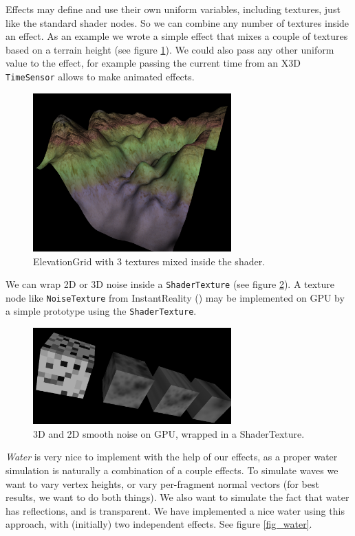\documentclass{egpubl}
\begin{document}
Effects may define and use their own uniform variables, including textures,
just like the standard shader nodes. So we can combine any number of textures
inside an effect. As an example we wrote a simple effect that mixes a couple of
textures based on a terrain height (see figure \ref{fig_terrain}).
We could also pass any other uniform value to the effect, for example
passing the current time from an X3D \texttt{TimeSensor} allows to make
animated effects.

\begin{figure}[H]
  \centering
  \includegraphics[width=3in]{terrain}
  \caption{ElevationGrid with 3 textures mixed inside the shader.}
  \label{fig_terrain}
\end{figure}

We can wrap 2D or 3D noise inside a \texttt{ShaderTexture}
(see figure \ref{fig_noise}).
A texture node like \texttt{NoiseTexture} from InstantReality
(\cite{instant:noisetex})
may be implemented on GPU by a simple prototype using the \texttt{ShaderTexture}.

\begin{figure}[H]
  \centering
  \includegraphics[width=3in]{noise-cropped}
  \caption{3D and 2D smooth noise on GPU, wrapped in a ShaderTexture.}
  \label{fig_noise}
\end{figure}

\emph{Water} is very nice to implement with the help of our effects,
as a proper water simulation
is naturally a combination of a couple effects.
To simulate waves we want to vary vertex
heights, or vary per-fragment normal vectors (for best results,
we want to do both things).
We also want to simulate the fact that water has reflections, and
is transparent. We have implemented a nice water using this approach,
with (initially) two independent effects. See figure \ref{fig_water}.
\end{document}
